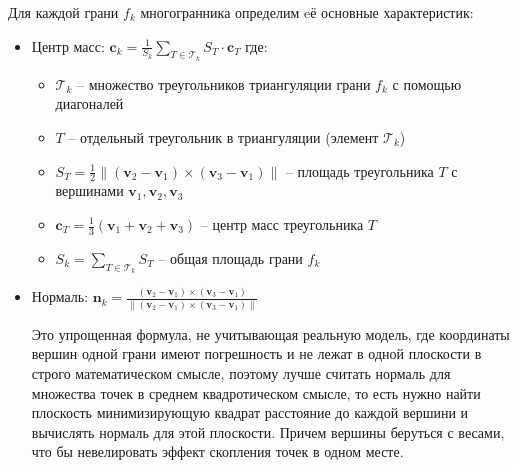 \documentclass[a4paper,12pt]{article}
\begin{document}
Для каждой грани $f_k$ многогранника определим eё основные характеристик:
\begin{itemize}
    \item Центр масс: $\mathbf{c}_k = \frac{1}{S_k} \sum\limits_{T \in \mathcal{T}_k} S_T \cdot \mathbf{c}_T$
    \noindent где:
    \begin{itemize}
        \item $\mathcal{T}_k$ -- множество треугольников триангуляции грани $f_k$ с помощью диагоналей
        \item $T$ -- отдельный треугольник в триангуляции (элемент $\mathcal{T}_k$)
        \item $S_T = \frac{1}{2}\|(\mathbf{v}_2 - \mathbf{v}_1) \times (\mathbf{v}_3 - \mathbf{v}_1)\|$ -- площадь треугольника $T$ 
            с вершинами $\mathbf{v}_1, \mathbf{v}_2, \mathbf{v}_3$
        \item $\mathbf{c}_T = \frac{1}{3}(\mathbf{v}_1 + \mathbf{v}_2 + \mathbf{v}_3)$ -- центр масс треугольника $T$
        \item $S_k = \sum_{T \in \mathcal{T}_k} S_T$ -- общая площадь грани $f_k$
    \end{itemize}
    \item Нормаль: $\mathbf{n}_k = \frac{(\mathbf{v}_2 - \mathbf{v}_1) \times (\mathbf{v}_3 - \mathbf{v}_1)}{\|(\mathbf{v}_2 - \mathbf{v}_1) \times (\mathbf{v}_3 - \mathbf{v}_1)\|}$

Это упрощенная формула, не учитывающая реальную модель, где координаты вершин одной грани имеют погрешность и не лежат
в одной плоскости в строго математическом смысле, поэтому лучше считать нормаль для множества точек в среднем квадротическом смысле,
то есть нужно найти плоскость минимизирующую квадрат расстояние до каждой вершини и вычислять нормаль для этой плоскости.
Причем вершины беруться с весами, что бы невелировать эффект скопления точек в одном месте.
\end{itemize}
\end{document}
